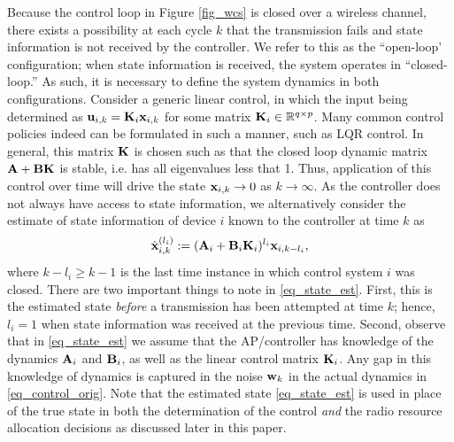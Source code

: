 Because the control loop in Figure \ref{fig_wcs} is closed over a wireless channel, there exists a possibility at each cycle $k$ that the transmission fails and state information is not received by the controller. We refer to this as the ``open-loop' configuration; when state information is received, the system operates in ``closed-loop.'' As such, it is necessary to define the system dynamics in both configurations. Consider a generic linear control, in which the input being determined as $ {\mathbf u}_{i,k} = {\mathbf K}_i {\mathbf x}_{i,k}$ for some matrix ${\mathbf K}_i \in {\mathbb R}^{q \times p}$. Many common control policies indeed can be formulated in such a manner, such as LQR control. In general, this matrix ${\mathbf K}$ is chosen such as that the closed loop dynamic matrix ${\mathbf A} + {\mathbf B} {\mathbf K}$ is stable, i.e. has all eigenvalues less that 1. Thus, application of this control over time will drive the state ${\mathbf x}_{i,k} \rightarrow 0$ as $k \rightarrow \infty$.  As the controller does not always have access to state information, we alternatively consider the estimate of state information of device $i$ known to the controller at time $k$ as
%
\begin{align}\label{eq_state_est}
\hbx^{(l_i)}_{i,k} :=(\bbA_i + \bbB_i\bbK_i)^{l_i} \bbx_{i,k-l_i},
\end{align}
%
where $k-l_i \geq k-1$ is the last time instance in which control system $i$ was closed. There are two important things to note in \eqref{eq_state_est}. First, this is the estimated state \emph{before} a transmission has been attempted at time $k$; hence, $l_i = 1$ when state information was received at the previous time. Second, observe that in \eqref{eq_state_est} we assume that the AP/controller has knowledge of the dynamics ${\mathbf A}_i$ and ${\mathbf B}_i$, as well as the linear control matrix ${\mathbf K}_i$. Any gap in this knowledge of dynamics is captured in the noise ${\mathbf w}_k$ in the actual dynamics in \eqref{eq_control_orig}. Note that the estimated state \eqref{eq_state_est} is used in place of the true state in both the determination of the control \emph{and} the radio resource allocation decisions as discussed later in this paper.

